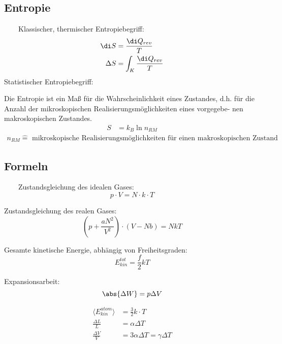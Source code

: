 \documentclass[11pt,letterpaper]{article}
\begin{document}
{{{}

\subsection{Entropie}{
    \ \ \ \ Klassischer, thermischer Entropiebegriff:
    \begin{align*}
        \di S &= \frac{\di Q_{rev}}{T} \\
        \Delta S &= \int_K \frac{\di Q_{rev}}{T} 
    \end{align*}
    Statistischer Entropiebegriff:

    Die Entropie ist ein Maß für die Wahrscheinlichkeit eines Zustandes, d.h. für
    die Anzahl der mikroskopischen Realisierungsmöglichkeiten eines vorgegebe-
    nen makroskopischen Zustandes.
    \begin{align*}
        S &= k_B \ln n_{RM}
    \end{align*}
    \begin{align*}
        n_{RM} \hat{=} \text{ mikroskopische Realisierungsmöglichkeiten für einen makroskopischen Zustand}
    \end{align*}
}


 \subsection{Formeln}{
    \ \ \ \ Zustandsgleichung des idealen Gases:
    \begin{equation*}
        p\cdot V = N\cdot k\cdot T
    \end{equation*}

    Zustandsgleichung des realen Gases:
    \begin{equation*}
        \left(p+\frac{a N^2}{V^2}\right) \cdot(V-N b)=N k T
    \end{equation*}

    Gesamte kinetische Energie, abhängig von Freiheitsgraden:
    \begin{equation*}
        E_{kin}^{tot} = \frac{f}{2} k T
    \end{equation*}

    Expansionsarbeit:
    \begin{equation*}
        \abs{\Delta W} = p\Delta V
    \end{equation*}

    \begin{align*}
        \langle E_{kin}^{atom}\rangle&=\frac{3}{2}k\cdot T \\
        \frac{\Delta L}{L}&=\alpha \Delta T\\
        \frac{\Delta V}{V} &= 3 \alpha \Delta T = \gamma \Delta T\\
    \end{align*}

}}}
\end{document}
